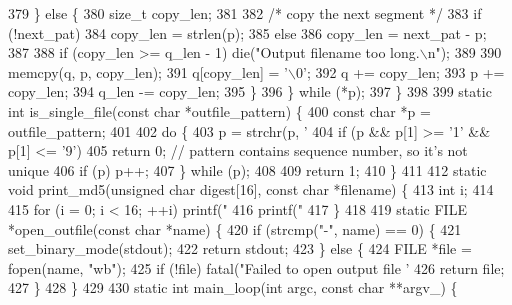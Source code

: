 \begin{DoxyCodeInclude}
{{{{{{{{{{{{{{{{{{{{{379     \} \textcolor{keywordflow}{else} \{
380       \textcolor{keywordtype}{size\_t} copy\_len;
381 
382       \textcolor{comment}{/* copy the next segment */}
383       \textcolor{keywordflow}{if} (!next\_pat)
384         copy\_len = strlen(p);
385       \textcolor{keywordflow}{else}
386         copy\_len = next\_pat - p;
387 
388       \textcolor{keywordflow}{if} (copy\_len >= q\_len - 1) die(\textcolor{stringliteral}{"Output filename too long.\(\backslash\)n"});
389 
390       memcpy(q, p, copy\_len);
391       q[copy\_len] = \textcolor{charliteral}{'\(\backslash\)0'};
392       q += copy\_len;
393       p += copy\_len;
394       q\_len -= copy\_len;
395     \}
396   \} \textcolor{keywordflow}{while} (*p);
397 \}
398 
399 \textcolor{keyword}{static} \textcolor{keywordtype}{int} is\_single\_file(\textcolor{keyword}{const} \textcolor{keywordtype}{char} *outfile\_pattern) \{
400   \textcolor{keyword}{const} \textcolor{keywordtype}{char} *p = outfile\_pattern;
401 
402   \textcolor{keywordflow}{do} \{
403     p = strchr(p, \textcolor{charliteral}{'%
404     \textcolor{keywordflow}{if} (p && p[1] >= \textcolor{charliteral}{'1'} && p[1] <= \textcolor{charliteral}{'9'})
405       \textcolor{keywordflow}{return} 0;  \textcolor{comment}{// pattern contains sequence number, so it's not unique}
406     \textcolor{keywordflow}{if} (p) p++;
407   \} \textcolor{keywordflow}{while} (p);
408 
409   \textcolor{keywordflow}{return} 1;
410 \}
411 
412 \textcolor{keyword}{static} \textcolor{keywordtype}{void} print\_md5(\textcolor{keywordtype}{unsigned} \textcolor{keywordtype}{char} digest[16], \textcolor{keyword}{const} \textcolor{keywordtype}{char} *filename) \{
413   \textcolor{keywordtype}{int} i;
414 
415   \textcolor{keywordflow}{for} (i = 0; i < 16; ++i) printf(\textcolor{stringliteral}{"%
416   printf(\textcolor{stringliteral}{"  %
417 \}
418 
419 \textcolor{keyword}{static} FILE *open\_outfile(\textcolor{keyword}{const} \textcolor{keywordtype}{char} *name) \{
420   \textcolor{keywordflow}{if} (strcmp(\textcolor{stringliteral}{"-"}, name) == 0) \{
421     set\_binary\_mode(stdout);
422     \textcolor{keywordflow}{return} stdout;
423   \} \textcolor{keywordflow}{else} \{
424     FILE *file = fopen(name, \textcolor{stringliteral}{"wb"});
425     \textcolor{keywordflow}{if} (!file) fatal(\textcolor{stringliteral}{"Failed to open output file '%
426     \textcolor{keywordflow}{return} file;
427   \}
428 \}
429 
430 \textcolor{keyword}{static} \textcolor{keywordtype}{int} main\_loop(\textcolor{keywordtype}{int} argc, \textcolor{keyword}{const} \textcolor{keywordtype}{char} **argv\_) \{
}}}}}}}}}}}}}}}}}}}}}}}}}
\end{DoxyCodeInclude}
